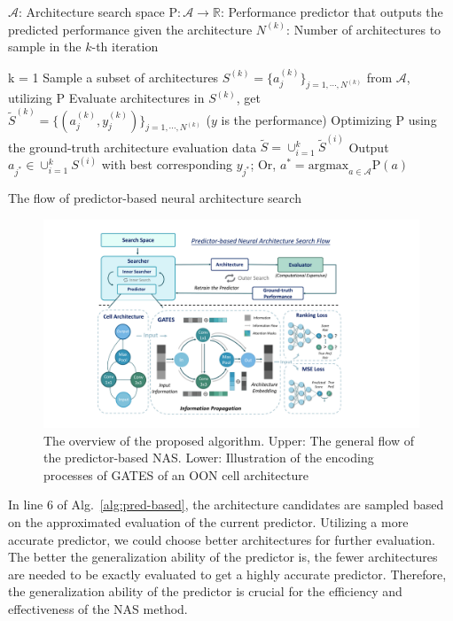\documentclass[runningheads]{llncs}
\begin{document}
\begin{algorithm}[bt]
\begin{algorithmic}[1]
\STATE $\mathcal{A}$: Architecture search space
\STATE $\mbox{P}: \mathcal{A} \to \mathbb{R}$: Performance predictor that outputs the predicted performance given the architecture
\STATE $N^{(k)}$: Number of architectures to sample in the $k$-th iteration
\item[]
\STATE k = 1
\STATE Sample a subset of architectures $S^{(k)} = \{a_j^{(k)}\}_{j=1,\cdots,N^{(k)}}$ from $\mathcal{A}$, utilizing $\mbox{P}$
\STATE Evaluate architectures in $S^{(k)}$, get $\tilde{S}^{(k)} =  \{(a_j^{(k)}, y_j^{(k)})\}_{j=1,\cdots,N^{(k)}}$ ($y$ is the performance)
\STATE Optimizing $\mbox{P}$ using the ground-truth architecture evaluation data $\tilde{S} = \cup^{k}_{i=1} \tilde{S}^{(i)}$
\ENDWHILE
\STATE Output $a_{j^*} \in \cup^{k}_{i=1} S^{(i)}$ with best corresponding $y_{j^*}$; Or, $a^* = \mbox{argmax}_{a \in \mathcal{A}} \mbox{P}(a)$
\end{algorithmic}
\caption{The flow of predictor-based neural architecture search}
\label{alg:pred-based}
\end{algorithm}


\begin{figure}[tb]
  \begin{center}
    \includegraphics[width=0.98\linewidth]{figs/gates.pdf}
    \vspace{-10pt}
    \caption{The overview of the proposed algorithm. Upper: The general flow of the predictor-based NAS. Lower: Illustration of the encoding processes of GATES of an OON cell architecture}
    \label{fig:gates}
  \end{center}

\end{figure}


In line 6 of Alg.~\ref{alg:pred-based}, the architecture candidates are sampled based on the approximated evaluation of the current predictor.
Utilizing a more accurate predictor, we could choose better architectures for further evaluation. 
The better the generalization ability of the predictor is, the fewer architectures are needed to be exactly evaluated to get a highly accurate
predictor. Therefore, the generalization ability of the predictor is crucial for the efficiency and effectiveness of the NAS method.
\end{document}
